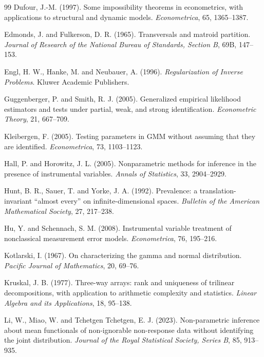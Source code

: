 \documentclass[11pt,a4paper]{ltjsarticle}
\theoremstyle{remark}
\begin{document}
\begin{thebibliography}{99}
Dufour, J.-M. (1997).
Some impossibility theorems in econometrics, with applications to structural and dynamic models.
\emph{Econometrica}, 65, 1365--1387.

Edmonds, J. and Fulkerson, D. R. (1965).
Transversals and matroid partition.
\emph{Journal of Research of the National Bureau of Standards, Section B}, 69B, 147--153.

Engl, H. W., Hanke, M. and Neubauer, A. (1996).
\emph{Regularization of Inverse Problems}.
Kluwer Academic Publishers.


Guggenberger, P. and Smith, R. J. (2005).
Generalized empirical likelihood estimators and tests under partial, weak, and strong identification.
\emph{Econometric Theory}, 21, 667--709.

Kleibergen, F. (2005).
Testing parameters in GMM without assuming that they are identified.
\emph{Econometrica}, 73, 1103--1123.

Hall, P. and Horowitz, J. L. (2005).
Nonparametric methods for inference in the presence of instrumental variables.
\emph{Annals of Statistics}, 33, 2904--2929.



Hunt, B. R., Sauer, T. and Yorke, J. A. (1992).
Prevalence: a translation-invariant ``almost every'' on infinite-dimensional spaces.
\emph{Bulletin of the American Mathematical Society}, 27, 217--238.

Hu, Y. and Schennach, S. M. (2008).
Instrumental variable treatment of nonclassical measurement error models.
\emph{Econometrica}, 76, 195--216.

Kotlarski, I. (1967).
On characterizing the gamma and normal distribution.
\emph{Pacific Journal of Mathematics}, 20, 69--76.

Kruskal, J. B. (1977).
Three-way arrays: rank and uniqueness of trilinear decompositions, with application to arithmetic complexity and statistics.
\emph{Linear Algebra and its Applications}, 18, 95--138.

Li, W., Miao, W. and Tchetgen Tchetgen, E. J. (2023).
Non-parametric inference about mean functionals of non-ignorable non-response data without identifying the joint distribution.
\emph{Journal of the Royal Statistical Society, Series B}, 85, 913--935.


\end{thebibliography}
\end{document}
